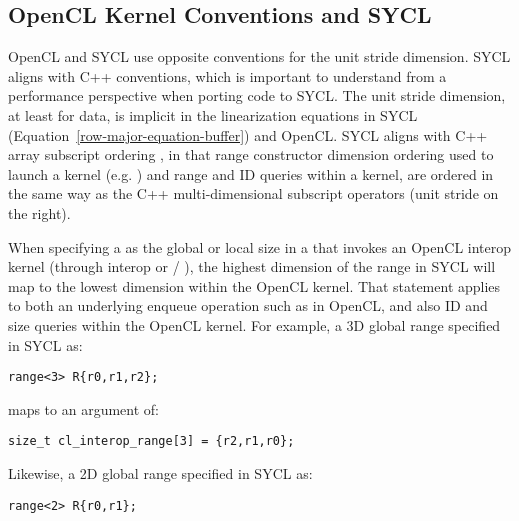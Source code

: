 \subsection{OpenCL Kernel Conventions and SYCL}
\label{subsec:opencl-kern-conventions-and-sycl}

OpenCL and SYCL use opposite conventions for the unit stride dimension.  SYCL
aligns with C++ conventions, which is important to understand from a performance
perspective when porting code to SYCL.  The unit stride dimension, at least for data, is implicit in the
linearization equations in SYCL (Equation~\ref{row-major-equation-buffer}) and OpenCL.  SYCL aligns with C++ array subscript ordering
, in that range constructor dimension ordering used to launch a kernel
(e.g. ) and range and ID queries within a kernel, are ordered in
the same way as the C++ multi-dimensional subscript operators (unit stride on the right).

When specifying a  as the global or local size
in a  that invokes an OpenCL interop kernel (through
 interop or /
),
the highest dimension of the range in SYCL will map to the
lowest dimension within the OpenCL kernel.  That statement applies to both
an underlying enqueue operation such as 
in OpenCL, and also ID and size queries within the OpenCL kernel.
For example, a 3D global range specified in SYCL as:

\begin{lstlisting}[style=nonumbers]
range<3> R{r0,r1,r2};
\end{lstlisting}

maps to an   argument
of:

\begin{lstlisting}[style=nonumbers]
size_t cl_interop_range[3] = {r2,r1,r0};
\end{lstlisting}

Likewise, a 2D global range specified in SYCL as:

\begin{lstlisting}[style=nonumbers]
range<2> R{r0,r1};
\end{lstlisting}

